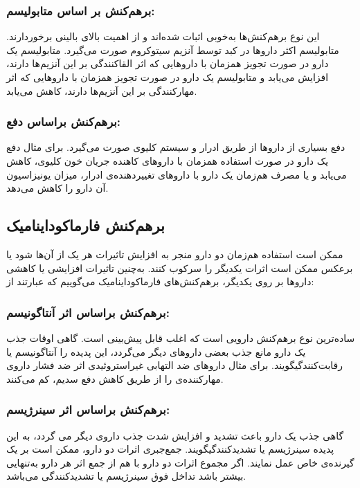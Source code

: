 \subsubsection*{برهم‌کنش بر اساس متابولیسم:‌ }
این نوع برهم‌کنش‌ها به‌خوبی اثبات‌ شده‌اند و از اهمیت بالای بالینی برخوردارند. متابولیسم
اکثر دارو‌ها در کبد توسط آنزیم سیتوکروم
صورت می‌گیرد. متابولیسم یک دارو در صورت تجویز همزمان با داروهایی که اثر القاکنندگی بر این آنزیم‌ها دارند، افزایش می‌یابد و  متابولیسم یک دارو در صورت تجویز همزمان با داروهایی که اثر مهارکنندگی بر این آنزیم‌ها دارند، کاهش می‌یابد. 

\par
\subsubsection*{برهم‌کنش بر‌اساس دفع: }
دفع
بسیاری از داروها از طریق ادرار و سیستم کلیوی صورت می‌گیرد. برای مثال دفع یک دارو در صورت استفاده همزمان با داروهای کاهنده جريان خون کليوی، کاهش می‌یابد و یا مصرف هم‌زمان یک دارو با داروهای تغيير‌دهنده‌ی
ادرار، ميزان يونيزاسيون آن دارو را کاهش‌ می‌دهد.


\subsection{برهم‌کنش فارماکوداینامیک}
ممکن‌ است استفاده هم‌زمان دو دارو منجر به افزایش تاثیرات هر یک از آن‌ها شود یا برعکس ممکن‌ است اثرات یکدیگر را سرکوب کنند. به‌چنین تاثیرات افزایشی یا کاهشی داروها بر روی یکدیگر، برهم‌کنش‌های فارماکوداینامیک می‌گوییم که عبارتند از:

\subsubsection*{برهم‌کنش بر‌اساس اثر آنتاگونیسم: }

ساده‌ترین نوع برهم‌کنش دارویی است که اغلب قابل پیش‌بینی است. گاهی اوقات جذب یک دارو مانع جذب بعضی داروهای دیگر می‌گردد، این پدیده را آنتاگونیسم یا رقابت‌کنندگیگویند\cite{kenakin1997pharmacologic}.
برای مثال دارو‌های ضد التهابی غیراستروئیدی
اثر ضد فشار داروی مهارکننده‌ی
را از طریق کاهش دفع سديم، کم می‌کنند.

\subsubsection*{برهم‌کنش بر‌اساس اثر سینرژیسم: }
گاهی جذب یک دارو باعث تشدید و افزایش شدت جذب داروی دیگر می گردد، به این پدیده سینرژیسم یا تشدیدکنندگیگویند\cite{chou2006theoretical}.
جمع‌جبری اثرات دو دارو، ممکن‌ است بر يک گيرنده‌ی خاص عمل نمايند. اگر مجموع اثرات دو دارو با هم از جمع اثر هر دارو  به‌تنهايی بيشتر باشد تداخل فوق سینرژیسم یا تشدید‌کنندگی می‌باشد.                

